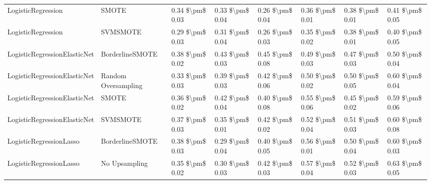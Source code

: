 \begin{tabular}{llllllll}
             LogisticRegression &                         SMOTE &     0.34 \$\textbackslash pm\$ 0.03 &           0.33 \$\textbackslash pm\$ 0.04 &       0.26 \$\textbackslash pm\$ 0.04 &        0.36 \$\textbackslash pm\$ 0.01 &                         0.38 \$\textbackslash pm\$ 0.01 & 0.41 \$\textbackslash pm\$ 0.05 \\
             LogisticRegression &                      SVMSMOTE &     0.29 \$\textbackslash pm\$ 0.03 &           0.31 \$\textbackslash pm\$ 0.04 &       0.26 \$\textbackslash pm\$ 0.03 &        0.35 \$\textbackslash pm\$ 0.02 &                         0.38 \$\textbackslash pm\$ 0.01 & 0.40 \$\textbackslash pm\$ 0.05 \\
   LogisticRegressionElasticNet &               BorderlineSMOTE &     0.38 \$\textbackslash pm\$ 0.02 &           0.43 \$\textbackslash pm\$ 0.03 &       0.45 \$\textbackslash pm\$ 0.08 &        0.49 \$\textbackslash pm\$ 0.03 &                         0.47 \$\textbackslash pm\$ 0.03 & 0.50 \$\textbackslash pm\$ 0.04 \\
   LogisticRegressionElasticNet &           Random Oversampling &     0.33 \$\textbackslash pm\$ 0.03 &           0.39 \$\textbackslash pm\$ 0.03 &       0.42 \$\textbackslash pm\$ 0.06 &        0.50 \$\textbackslash pm\$ 0.02 &                         0.50 \$\textbackslash pm\$ 0.05 & 0.60 \$\textbackslash pm\$ 0.04 \\
   LogisticRegressionElasticNet &                         SMOTE &     0.36 \$\textbackslash pm\$ 0.02 &           0.42 \$\textbackslash pm\$ 0.04 &       0.40 \$\textbackslash pm\$ 0.08 &        0.55 \$\textbackslash pm\$ 0.06 &                         0.45 \$\textbackslash pm\$ 0.02 & 0.59 \$\textbackslash pm\$ 0.06 \\
   LogisticRegressionElasticNet &                      SVMSMOTE &     0.37 \$\textbackslash pm\$ 0.03 &           0.35 \$\textbackslash pm\$ 0.01 &       0.42 \$\textbackslash pm\$ 0.02 &        0.52 \$\textbackslash pm\$ 0.04 &                         0.51 \$\textbackslash pm\$ 0.03 & 0.60 \$\textbackslash pm\$ 0.08 \\
        LogisticRegressionLasso &               BorderlineSMOTE &     0.38 \$\textbackslash pm\$ 0.03 &           0.29 \$\textbackslash pm\$ 0.04 &       0.40 \$\textbackslash pm\$ 0.05 &        0.56 \$\textbackslash pm\$ 0.01 &                         0.50 \$\textbackslash pm\$ 0.04 & 0.60 \$\textbackslash pm\$ 0.03 \\
        LogisticRegressionLasso &                 No Upsampling &     0.35 \$\textbackslash pm\$ 0.02 &           0.30 \$\textbackslash pm\$ 0.03 &       0.42 \$\textbackslash pm\$ 0.03 &        0.57 \$\textbackslash pm\$ 0.04 &                         0.52 \$\textbackslash pm\$ 0.03 & 0.63 \$\textbackslash pm\$ 0.05 \\

\end{tabular}

